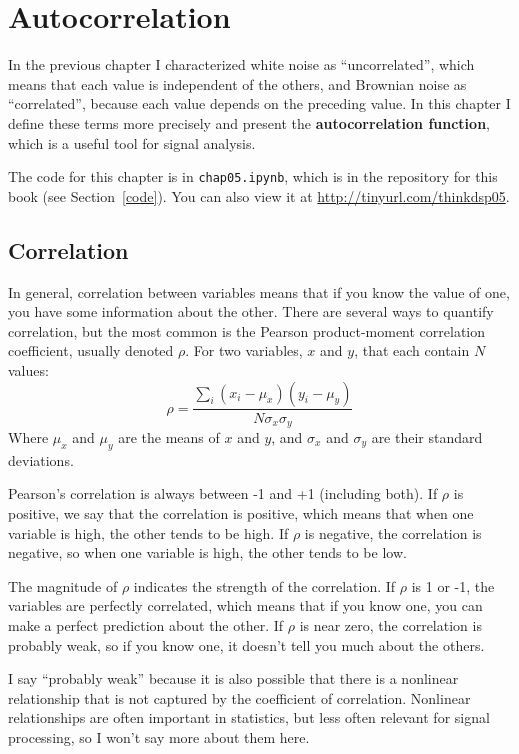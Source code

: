 \chapter{Autocorrelation}

In the previous chapter I characterized white noise as ``uncorrelated'',
which means that each value is independent of the others, and Brownian
noise as ``correlated'', because each value depends on the preceding
value.  In this chapter I define these terms more precisely and
present the {\bf autocorrelation function}, which is a useful tool
for signal analysis.

The code for this chapter is in {\tt chap05.ipynb}, which is in the
repository for this book (see Section~\ref{code}).
You can also view it at \url{http://tinyurl.com/thinkdsp05}.


\section{Correlation}

In general, correlation between variables means that if you know the
value of one, you have some information about the other.  There are
several ways to quantify correlation, but the most common is the
Pearson product-moment correlation coefficient, usually denoted
$\rho$.  For two variables, $x$ and $y$, that each contain $N$ values:
%
\[ \rho = \frac{ \sum_i (x_i - \mu_x) (y_i - \mu_y)}{N \sigma_x \sigma_y} \]
%
Where $\mu_x$ and $\mu_y$ are the means of $x$ and $y$, and
$\sigma_x$ and $\sigma_y$ are their standard deviations.

Pearson's correlation is always between -1 and +1 (including both).
If $\rho$ is positive, we say that the correlation is positive,
which means that when one variable is high, the other tends to be
high.  If $\rho$ is negative, the correlation is negative, so
when one variable is high, the other tends to be low.

The magnitude of $\rho$ indicates the strength of the correlation.  If
$\rho$ is 1 or -1, the variables are perfectly correlated, which means
that if you know one, you can make a perfect prediction about the
other.  If $\rho$ is near zero, the correlation is probably weak, so
if you know one, it doesn't tell you much about the others.

I say ``probably weak'' because it is also possible that there is
a nonlinear relationship that is not captured by the coefficient
of correlation.  Nonlinear relationships are often important in
statistics, but less often relevant for signal processing, so I
won't say more about them here.

